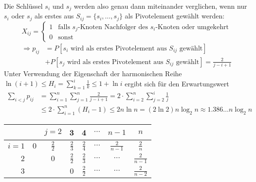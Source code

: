 Die Schlüssel $s_i$ und $s_j$ werden also genau dann miteinander verglichen,
wenn nur $s_i$ oder $s_j$ als erstes aus $S_{ij} = \{ s_i, \dots, s_j \}$ als
Pivotelement gewählt werden:
\[
  X_{ij} = \begin{cases} 1 & \text{falls $s_j$-Knoten Nachfolger des
  $s_i$-Knoten oder umgekehrt} \\ 0 & \text{sonst} \end{cases}
\]
\begin{align*}
  \Rightarrow p_{ij} &= P\left[s_i \text{ wird als erstes Pivotelement aus $S_{ij}$ gewählt}\right] \\
  &+ P\left[s_j \text{ wird als erstes Pivotelement aus $S_{ij}$ gewählt}\right] = \frac{2}{j-i+1}
\end{align*}
Unter Verwendung der Eigenschaft der harmonischen Reihe $\ln(i+1) \leq H_i =
\sum_{k=1}^i \frac{1}{k} \leq 1 + \ln i$ ergibt sich für den Erwartungswert
\begin{align*}
	\sum_{i<j} p_{ij} &= \sum_{i=1}^n \sum_{j=1}^n \frac{2}{j-i+1} = 2 \cdot \sum_{i=2}^n \sum_{j=2}^i \frac{1}{j} \\
			  &\leq 2 \cdot \sum_{i=1}^n \left(H_i - 1\right) \leq 2 n \ln n = (2 \ln 2) n \log_2 n \approx 1.386\dots n \log_2 n
\end{align*}
\renewcommand\arraystretch{1.5}
\begin{tabular}{r|ccccccc}
	& & $j = 2$ & 3 & 4 & $\cdots$ & $n-1$ & $n$ \\
	\hline
	$i = 1$ & $0$ & $\frac{2}{2}$ & $\frac{2}{3}$ & $\frac{2}{4}$ & $\cdots$ & $\frac{2}{n-1}$ & $\frac{2}{n}$ \\
	$2$ && $0$ & $\frac{2}{2}$ & $\frac{2}{3}$ & $\cdots$ & $\cdots$ & $\frac{2}{n-1}$ \\
	$3$ &&& $0$ & $\frac{2}{2}$ & $\cdots$ & $\cdots$ & $\frac{2}{n-2}$
\end{tabular}

\newpage

